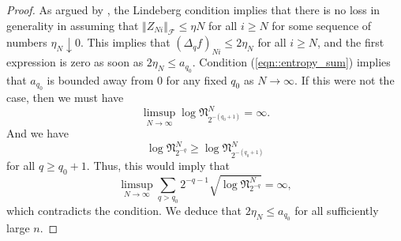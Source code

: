 \documentclass[11pt,a4paper]{article}
\begin{document}
\begin{appendices}
\begin{proof}
    As argued by \cite{vanderVaart2023}, the Lindeberg condition implies that there is no loss in generality in assuming that $\Vert Z_{Ni} \Vert_{\mathcal{F}} \leq \eta{N}$ for all $i \geq N$ for some sequence of numbers $\eta_{N} \downarrow 0$. This implies that $(\Delta_{q}f)_{Ni} \leq 2\eta_{N}$ for all $i \geq N$, and the first expression is zero as soon as $2\eta_{N} \leq a_{q_0}$. Condition (\ref{eqn::entropy_sum}) implies that $a_{q_{0}}$ is bounded away from 0 for any fixed $q_{0}$ as $N \rightarrow \infty$. If this were not the case, then we must have
    \begin{equation*}
        \limsup_{N \rightarrow \infty} \log \mathfrak{N}_{2^{-(q_{0} + 1)}}^{N} = \infty.
    \end{equation*}
    And we have
    \begin{equation*}
        \log \mathfrak{N}_{2^{-q}}^{N} \geq \log \mathfrak{N}_{2^{-(q_{0} + 1)}}^{N}
    \end{equation*}
    for all $q \geq q_{0} + 1$. Thus, this would imply that
    \begin{equation*}
        \limsup_{N \rightarrow \infty} \sum_{q > q_0} 2^{-q-1} \sqrt{\log \mathfrak{N}_{2^{-q}}^{N}} = \infty,
    \end{equation*}
    which contradicts the condition. We deduce that $2\eta_{N} \leq a_{q_0}$ for all sufficiently large $n$.


\end{proof}
\end{appendices}
\end{document}
